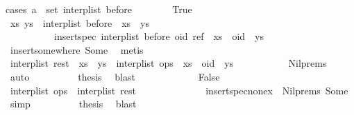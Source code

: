 \begin{isabellebody}
{\isacharparenleft}cases\ {\isachardoublequoteopen}a\ {\isasymin}\ set\ {\isacharparenleft}interp{\isacharunderscore}list\ before{\isacharparenright}{\isachardoublequoteclose}{\isacharparenright}\isanewline
\ \ \ \ \ \ \isamarkupfalse%
\ True\isanewline
\ \ \ \ \ \ \isamarkupfalse%
\ \isamarkupfalse%
\ xs\ ys\ \ {\isachardoublequoteopen}interp{\isacharunderscore}list\ before\ {\isacharequal}\ xs\ {\isacharat}\ ys\ {\isasymand}\isanewline
\ \ \ \ \ \ \ \ \ \ insert{\isacharunderscore}spec\ {\isacharparenleft}interp{\isacharunderscore}list\ before{\isacharparenright}\ {\isacharparenleft}oid{\isacharcomma}\ ref{\isacharparenright}\ {\isacharequal}\ xs\ {\isacharat}\ oid\ {\isacharhash}\ ys{\isachardoublequoteclose}\isanewline
\ \ \ \ \ \ \ \ \isamarkupfalse%
\ insert{\isacharunderscore}somewhere\ Some\ \isamarkupfalse%
\ metis\isanewline
\ \ \ \ \ \ \isamarkupfalse%
\ {\isachardoublequoteopen}interp{\isacharunderscore}list\ rest\ {\isacharequal}\ xs\ {\isacharat}\ ys\ {\isasymand}\ interp{\isacharunderscore}list\ ops\ {\isacharequal}\ xs\ {\isacharat}\ {\isacharbrackleft}oid{\isacharbrackright}\ {\isacharat}\ ys{\isachardoublequoteclose}\isanewline
\ \ \ \ \ \ \ \ \isamarkupfalse%
\ {}\ Nil{\isachardot}prems{\isacharparenleft}{}{\isacharparenright}\ \isamarkupfalse%
\ auto\isanewline
\ \ \ \ \ \ \isamarkupfalse%
\ \isamarkupfalse%
\ {\isacharquery}thesis\ \isamarkupfalse%
\ blast\isanewline
\ \ \ \ \isamarkupfalse%
\isanewline
\ \ \ \ \ \ \isamarkupfalse%
\ False\isanewline
\ \ \ \ \ \ \isamarkupfalse%
\ {\isachardoublequoteopen}interp{\isacharunderscore}list\ ops\ {\isacharequal}\ {\isacharparenleft}interp{\isacharunderscore}list\ rest{\isacharparenright}\ {\isacharat}\ {\isacharbrackleft}{\isacharbrackright}\ {\isacharat}\ {\isacharbrackleft}{\isacharbrackright}{\isachardoublequoteclose}\isanewline
\ \ \ \ \ \ \ \ \isamarkupfalse%
\ insert{\isacharunderscore}spec{\isacharunderscore}nonex\ {}\ Nil{\isachardot}prems{\isacharparenleft}{}{\isacharparenright}\ Some\ \isamarkupfalse%
\ simp\isanewline
\ \ \ \ \ \ \isamarkupfalse%
\ \isamarkupfalse%
\ {\isacharquery}thesis\ \isamarkupfalse%
\ blast\isanewline
\ \ \ \ \isamarkupfalse%
\isanewline
\ \ \isamarkupfalse%

\end{isabellebody}

